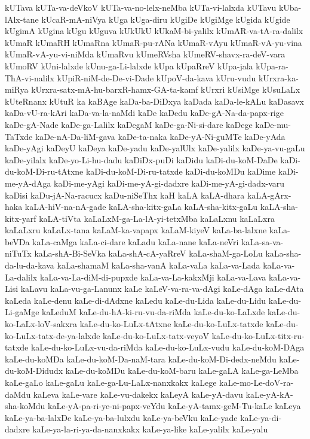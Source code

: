 {kUTava
kUTa-va-deVkoV
kUTa-va-no-lelx-neMba
kUTa-vi-lalxda
kUTavu
kUba-lAlx-tane
kUcaR-mA-niVya
kUga
kUga-diru
kUgiDe
kUgiMge
kUgida
kUgide
kUgimA
kUgina
kUgu
kUguva
kUkUkU
kUkaM-bi-yalilx
kUmAR-va-tA-ra-dalilx
kUmaR
kUmaRH
kUmaRna
kUmaR-pu-rANa
kUmaR-vAyu
kUmaR-vA-yu-vina
kUmaR-vA-yu-vi-niMda
kUmaRvu
kUmeRVsha
kUmeRV-shavx-ra-deV-vara
kUmoRV
kUni-lalxde
kUnu-ga-Li-lalxde
kUpa
kUpaRreV
kUpa-jala
kUpa-ra-ThA-vi-nalilx
kUpiR-niM-de-De-vi-Dade
kUpoV-da-kava
kUru-vudu
kUrxra-ka-miRya
kUrxra-satx-mA-hu-barxR-hamx-GA-ta-kamf
kUrxri
kUsiMge
kUsuLaLx
kUteRnanx
kUtuR
ka
kaBAge
kaDa-ba-DiDxya
kaDada
kaDa-le-kALu
kaDasavx
kaDa-vU-ra-kAri
kaDa-va-la-naMdi
kaDe
kaDedu
kaDe-gA-Na-da-papx-rige
kaDe-gA-Nade
kaDe-ga-Lalilx
kaDegaM
kaDe-ga-Ni-si-dare
kaDege
kaDe-mu-TaTxde
kaDe-nA-Da-liM-gava
kaDe-ta-naka
kaDe-yA-Ni-guMTe
kaDe-yAda
kaDe-yAgi
kaDeyU
kaDeya
kaDe-yadu
kaDe-yalUlx
kaDe-yalilx
kaDe-ya-vu-gaLu
kaDe-yilalx
kaDe-yo-Li-hu-dadu
kaDiDx-puDi
kaDidu
kaDi-du-koM-DaDe
kaDi-du-koM-Di-ru-tAtxne
kaDi-du-koM-Di-ru-tatxde
kaDi-du-koMDu
kaDime
kaDi-me-yA-dAga
kaDi-me-yAgi
kaDi-me-yA-gi-dadxre
kaDi-me-yA-gi-dadx-varu
kaDisi
kaDu-jA-Na-racucx
kaDu-niSeThx
kaH
kaLA
kaLA-dhara
kaLA-gArx-haka
kaLA-hiV-na-nA-gade
kaLA-sha-kitx-gaLa
kaLA-sha-kitx-gaLu
kaLA-sha-kitx-yarf
kaLA-tiVta
kaLaLxM-ga-La-lA-yi-tetxMba
kaLaLxnu
kaLaLxra
kaLaLxru
kaLaLx-tana
kaLaM-ka-vapapx
kaLaM-kiyeV
kaLa-ba-lalxne
kaLa-beVDa
kaLa-caMga
kaLa-ci-dare
kaLadu
kaLa-nane
kaLa-neVri
kaLa-sa-va-niTuTx
kaLa-shA-Bi-SeVka
kaLa-shA-cA-yaRreV
kaLa-shaM-ga-LoLu
kaLa-sha-da-lu-da-kava
kaLa-shamaM
kaLa-sha-vanA
kaLa-vaLa
kaLa-va-Lada
kaLa-va-La-dalilx
kaLa-va-La-diM-di-pupxde
kaLa-va-La-kakxMji
kaLa-va-Lava
kaLa-va-Lisi
kaLavu
kaLa-vu-ga-Lanunx
kaLe
kaLeV-va-ra-va-dAgi
kaLe-dAga
kaLe-dAta
kaLeda
kaLe-denu
kaLe-di-dAdxne
kaLedu
kaLe-du-Lida
kaLe-du-Lidu
kaLe-du-Li-gaMge
kaLeduM
kaLe-du-hA-ki-ru-vu-da-riMda
kaLe-du-ko-LaLxde
kaLe-du-ko-LaLx-loV-sakxra
kaLe-du-ko-LuLx-tAtxne
kaLe-du-ko-LuLx-tatxde
kaLe-du-ko-LuLx-tatx-de-ya-lalxde
kaLe-du-ko-LuLx-tatx-veyoV
kaLe-du-ko-LuLx-titx-ru-tatxde
kaLe-du-ko-LuLx-vu-da-riMda
kaLe-du-ko-LuLx-vudu
kaLe-du-koM-DAga
kaLe-du-koMDa
kaLe-du-koM-Da-naM-tara
kaLe-du-koM-Di-dedx-neMdu
kaLe-du-koM-Didudx
kaLe-du-koMDu
kaLe-du-koM-baru
kaLe-gaLA
kaLe-ga-LeMba
kaLe-gaLo
kaLe-gaLu
kaLe-ga-Lu-LaLx-nanxkakx
kaLege
kaLe-mo-Le-doV-ra-daMdu
kaLeva
kaLe-vare
kaLe-vu-dakekx
kaLeyA
kaLe-yA-davu
kaLe-yA-kA-sha-koMdu
kaLe-yA-pa-ri-ye-ni-papx-veYdu
kaLe-yA-tamx-geM-Tu-kaLe
kaLeya
kaLe-ya-ba-lalxDe
kaLe-ya-ba-lulxdu
kaLe-ya-beVku
kaLe-yade
kaLe-ya-di-dadxre
kaLe-ya-la-ri-ya-da-nanxkakx
kaLe-ya-like
kaLe-yalilx
kaLe-yalu
}
